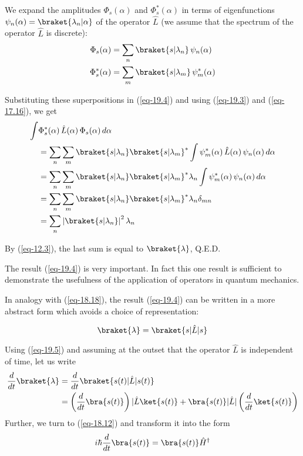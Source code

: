 \documentclass[a4paper,sfsidenotes,colorlinks=true]{tufte-book}
\numberwithin{equation}{section}
\numberwithin{figure}{section}
\begin{document}
We expand the amplitudes $\Phi_{s}(\alpha)$ and $\Phi_{s}^{*}(\alpha)$
in terms of eigenfunctions $\psi_{n}(\alpha) = \braket{\lambda_n |
  \alpha }$ of the operator $\hat{L}$ (we assume that the spectrum of
the operator $\hat{L}$ is discrete):
\begin{align*}
\Phi_{s} (\alpha) & = \sum_{n} \braket{s | \lambda_{n}} \, \psi_{n}
(\alpha) \\
\Phi_{s}^{*} (\alpha) & = \sum_{m} \braket{s | \lambda_{m}} \, \psi_{m}^{*}
(\alpha) 
\end{align*}

Substituting these superpositions in (\ref{eq-19.4}) and using (\ref{eq-19.3}) and
(\ref{eq-17.16}), we get 
\begin{align*}
\int & \Phi^{*}_{s} (\alpha) \, \hat{L}(\alpha) \, \Phi_{s}(\alpha) \,
d \alpha \\
& = \sum_{n} \sum_{m} \braket{s| \lambda_{n}}
\braket{s|\lambda_{m}}^{*} \int \psi^{*}_{m} (\alpha) \, \hat{L}
(\alpha) \, \psi_{n} (\alpha) \, d \alpha\\
& = \sum_{n} \sum_{m} \braket{s| \lambda_{n}}
\braket{s|\lambda_{m}}^{*} \lambda_{n} \int \psi^{*}_{m} (\alpha) \,  \psi_{n} (\alpha) \, d \alpha\\
& = \sum_{n} \sum_{m} \braket{s| \lambda_{n}}
\braket{s|\lambda_{m}}^{*} \lambda_{n} \delta_{mn}\\
& = \sum_{n} \left| \braket{s|\lambda_{n}} \right|^{2} \lambda_{n}
\end{align*}

By (\ref{eq-12.3}), the last sum is equal to $\braket{\lambda}$, Q.E.D. 

The result (\ref{eq-19.4}) is very important. In fact this one result is
sufficient to demonstrate the usefulness of the application of
operators in quantum mechanics. 

In analogy with (\ref{eq-18.18}), the result (\ref{eq-19.4}) can be written in a more
abstract form which avoids a choice of representation:

\begin{equation}
\braket{\lambda}  = \braket{s| \hat{L} | s} 
\label{eq-19.5}
\end{equation}

Using  (\ref{eq-19.5}) and assuming at the outset that the operator $\hat{L}$ is
independent of time, let us write 
\begin{equation}
\begin{split}
\frac{d}{dt} \braket{\lambda} & = \frac{d}{dt} \braket{s(t) | \hat{L} |
  s(t)}\\
& = \left( \frac{d}{dt} \bra{s(t)} \right) | \hat{L} \ket{s(t)} +
\bra{s(t)} | \hat{L} | \left( \frac{d}{dt} \ket{s(t)} \right)
\end{split}
\label{eq-9.6} 
\end{equation}
Further, we turn to (\ref{eq-18.12}) and transform it into the form
\begin{equation*}
i \hbar \frac{d}{dt} \bra{s(t)} = \bra{s(t)} \hat{H}^{\dagger}
 \end{equation*}
\end{document}
